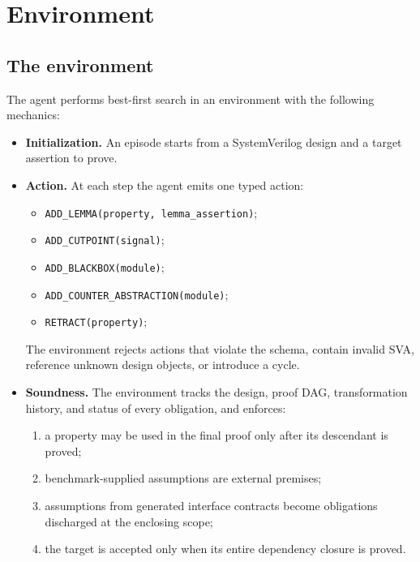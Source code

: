 \section{Environment}
\label{sec:environment}

\subsection{The environment}

The agent performs best-first search in an environment with the following mechanics:

\begin{itemize}[nosep]
    \item \textbf{Initialization.} An episode starts from a SystemVerilog design and a target assertion to prove.

    \item \textbf{Action.} At each step the agent emits one typed action:
    \begin{itemize}[nosep]
        \item \texttt{ADD\_LEMMA(property, lemma\_assertion)};
        \item \texttt{ADD\_CUTPOINT(signal)};
        \item \texttt{ADD\_BLACKBOX(module)};
        \item \texttt{ADD\_COUNTER\_ABSTRACTION(module)};
        \item \texttt{RETRACT(property)};
    \end{itemize}
    The environment rejects actions that violate the schema, contain invalid SVA, reference unknown design objects, or introduce a cycle.

    \item \textbf{Soundness.} The environment tracks the design, proof DAG,
    transformation history, and status of every obligation, and enforces:
    \begin{enumerate}[nosep]
        \item a property may be used in the final proof only after its descendant is proved;
        \item benchmark-supplied assumptions are external premises;
        \item assumptions from generated interface contracts become obligations discharged at the enclosing scope;
        \item the target is accepted only when its entire dependency closure is
        proved.
    \end{enumerate}


\end{itemize}
